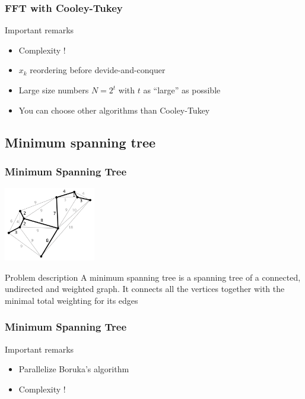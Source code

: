 \begin{frame}[containsverbatim]
\frametitle{FFT with Cooley-Tukey}
\begin{block}{Important remarks}
\begin{itemize}
	\item{Complexity !}
	\item{$x_k$ reordering before devide-and-conquer}
	\item{Large size numbers $N = 2^t$ with $t$ as ``large'' as possible}
	\item{You can choose other algorithms than Cooley-Tukey}
\end{itemize}
\end{block}
\end{frame}




\subsection{Minimum spanning tree}
\begin{frame}[containsverbatim]
\frametitle{Minimum Spanning Tree}
\begin{center}
\includegraphics[width=4.0cm]{Day2/images/spanning.png}
\end{center}
\begin{block}{Problem description}
A minimum spanning tree is a spanning tree of a connected, undirected and weighted graph. It connects all the vertices together with the minimal total weighting for its edges
\end{block}
\end{frame}
\begin{frame}[containsverbatim]
\frametitle{Minimum Spanning Tree}
\begin{block}{Important remarks}
\begin{itemize}
	\item{Parallelize Boruka's algorithm}
	\item{Complexity !}
\end{itemize}
\end{block}
\end{frame}




